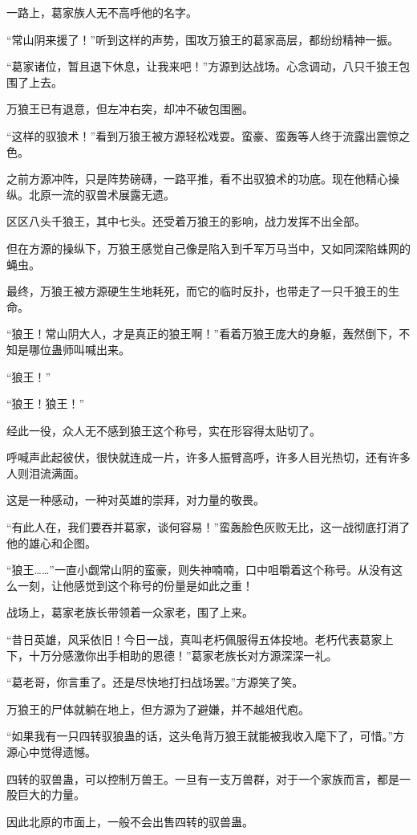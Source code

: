 \begin{this_body}
一路上，葛家族人无不高呼他的名字。

“常山阴来援了！”听到这样的声势，围攻万狼王的葛家高层，都纷纷精神一振。

“葛家诸位，暂且退下休息，让我来吧！”方源到达战场。心念调动，八只千狼王包围了上去。

万狼王已有退意，但左冲右突，却冲不破包围圈。

“这样的驭狼术！”看到万狼王被方源轻松戏耍。蛮豪、蛮轰等人终于流露出震惊之色。

之前方源冲阵，只是阵势磅礴，一路平推，看不出驭狼术的功底。现在他精心操纵。北原一流的驭兽术展露无遗。

区区八头千狼王，其中七头。还受着万狼王的影响，战力发挥不出全部。

但在方源的操纵下，万狼王感觉自己像是陷入到千军万马当中，又如同深陷蛛网的蝇虫。

最终，万狼王被方源硬生生地耗死，而它的临时反扑，也带走了一只千狼王的生命。

“狼王！常山阴大人，才是真正的狼王啊！”看着万狼王庞大的身躯，轰然倒下，不知是哪位蛊师叫喊出来。

“狼王！”

“狼王！狼王！”

经此一役，众人无不感到狼王这个称号，实在形容得太贴切了。

呼喊声此起彼伏，很快就连成一片，许多人振臂高呼，许多人目光热切，还有许多人则泪流满面。

这是一种感动，一种对英雄的崇拜，对力量的敬畏。

“有此人在，我们要吞并葛家，谈何容易！”蛮轰脸色灰败无比，这一战彻底打消了他的雄心和企图。

“狼王……”一直小觑常山阴的蛮豪，则失神喃喃，口中咀嚼着这个称号。从没有这么一刻，让他感觉到这个称号的份量是如此之重！

战场上，葛家老族长带领着一众家老，围了上来。

“昔日英雄，风采依旧！今日一战，真叫老朽佩服得五体投地。老朽代表葛家上下，十万分感激你出手相助的恩德！”葛家老族长对方源深深一礼。

“葛老哥，你言重了。还是尽快地打扫战场罢。”方源笑了笑。

万狼王的尸体就躺在地上，但方源为了避嫌，并不越俎代庖。

“如果我有一只四转驭狼蛊的话，这头龟背万狼王就能被我收入麾下了，可惜。”方源心中觉得遗憾。

四转的驭兽蛊，可以控制万兽王。一旦有一支万兽群，对于一个家族而言，都是一股巨大的力量。

因此北原的市面上，一般不会出售四转的驭兽蛊。


\end{this_body}

